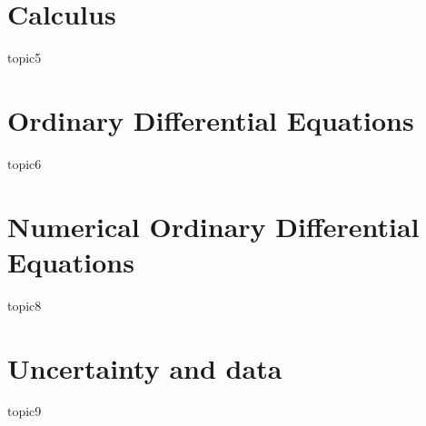 \documentclass[12pt,a4paper]{article}
\begin{document}
	\tableofcontents
    \section{Calculus}
    {topic5}
    \section{Ordinary Differential Equations}
    {topic6}
    \section{Numerical Ordinary Differential Equations}
    {topic8}
    \section{Uncertainty and data}
    {topic9}
\end{document}
